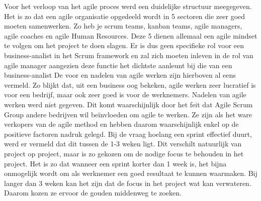 \documentclass{hogent-article}
\begin{document}
Voor het verloop van het agile proces werd een duidelijke structuur meegegeven. Het is zo dat een agile organisatie opgedeeld wordt in 5 sectoren die zeer goed moeten samenwerken. Zo heb je scrum teams, kanban teams, agile managers, agile coaches en agile Human Resources. Deze 5 dienen allemaal een agile mindset te volgen om het project te doen slagen. Er is dus geen specifieke rol voor een business-analist in het Scrum framework en zal zich moeten inleven in de rol van agile manager aangezien deze functie het dichtste aanleunt bij die van een business-analist \newline
\newline
De voor en nadelen van agile werken zijn hierboven al eens vermeld. Zo blijkt dat, uit een business oog bekeken, agile werken zeer lucratief is voor een bedrijf, maar ook zeer goed is voor de werknemers. Nadelen van agile werken werd niet gegeven. Dit komt waarschijnlijk door het feit dat Agile Scrum Group andere bedrijven wil beïnvloeden om agile te werken. Ze zijn als het ware verkopers van de agile method en hebben daarom waarschijnlijk enkel op de positieve factoren nadruk gelegd.\newline
\newline
Bij de vraag hoelang een sprint effectief duurt, werd er vermeld dat dit tussen de 1-3 weken ligt. Dit verschilt natuurlijk van project op project, maar is zo gekozen om de nodige focus te behouden in het project. Het is zo dat wanneer een sprint korter dan 1 week is, het bijna onmogelijk wordt om als werknemer een goed resultaat te kunnen waarmaken. Bij langer dan 3 weken kan het zijn dat de focus in het project wat kan verwateren. Daarom kozen ze ervoor de gouden middenweg te zoeken.
\end{document}
